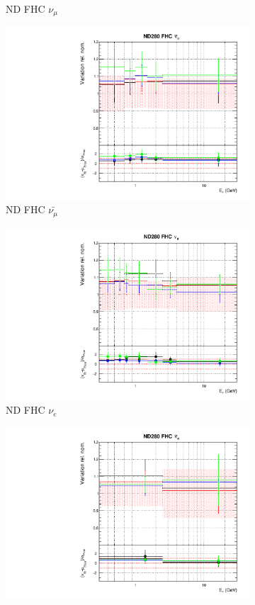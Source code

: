 \begin{figure}[t]
\begin{subfigure}{0.45\textwidth}
  \caption{ND FHC $\nu_{\mu}$}
\end{subfigure}
\begin{subfigure}{0.45\textwidth}
  \centering
  \includegraphics[width=0.75\linewidth]{figs/detcovbinflux_1}
  \caption{ND FHC $\bar{\nu_{\mu}}$}
\end{subfigure}
\begin{subfigure}{0.45\textwidth}
  \centering
  \includegraphics[width=0.75\linewidth]{figs/detcovbinflux_2}
  \caption{ND FHC $\nu_e$}
\end{subfigure}
\begin{subfigure}{0.45\textwidth}
  \centering
  \includegraphics[width=0.75\linewidth]{figs/detcovbinflux_3}

\end{subfigure}
\end{figure}

